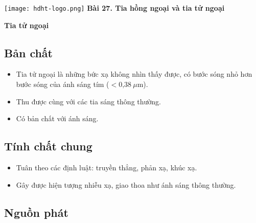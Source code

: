 \newcommand{\chapter}[2][]{
	\newcommand{\chapname}{#2}
	\begin{flushleft}
		\begin{minipage}[t]{\linewidth}
			\texttt{[image: hdht-logo.png]}
			\hspace{0pt}	
			\sffamily\bfseries\large Bài  27. Tia hồng ngoại và tia tử ngoại
			\begin{flushleft}
				\huge\bfseries #1
			\end{flushleft}
		\end{minipage}
	\end{flushleft}
	\vspace{1cm}
	\normalfont\normalsize
}
\chapter[Tia tử ngoại]{Tia tử ngoại}


\subsection {Bản chất}

\begin{itemize}
	\item Tia tử ngoại là những bức xạ không nhìn thấy được, có bước sóng nhỏ hơn bước sóng của ánh sáng tím ($< \text{0,38}\ \mu \text{m}$). 
	\item Thu được cùng với các tia sáng thông thường.
	\item Có bản chất với ánh sáng.
\end{itemize}

\subsection{Tính chất chung}
\begin{itemize}
	\item Tuân theo các định luật: truyền thẳng, phản xạ, khúc xạ.
	\item Gây được hiện tượng nhiễu xạ, giao thoa như ánh sáng thông thường. 
\end{itemize}

\subsection{Nguồn phát}

